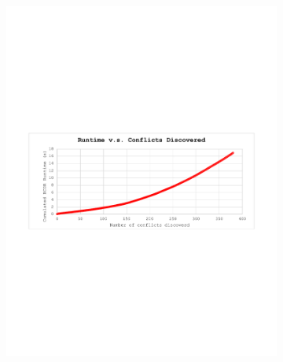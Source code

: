 \documentclass[jair,twoside,11pt,theapa]{article}
\begin{document}
\begin{figure}[!ht]
	\centering
	\begin{subfigure}[b]{0.8\textwidth}
		\includegraphics[width=\textwidth,trim={2.6cm 10.2cm 2.4cm 10.3cm},clip]{figures/BunchConflict/runtime_conflict_discovered_nobunch.pdf}
		\caption{}
		\label{fig:cumulatied_conflict_discovery}
	\end{subfigure}
	\begin{subfigure}[b]{0.8\textwidth}

\end{subfigure}
\end{figure}
\end{document}
